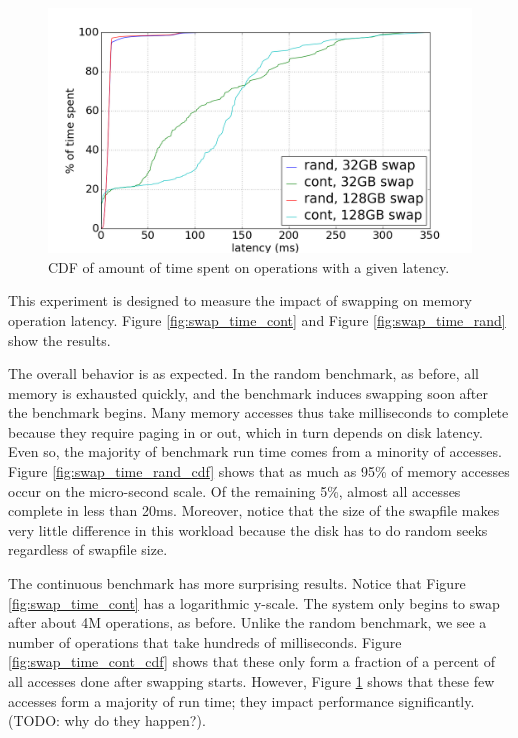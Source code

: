 \documentclass[twocolumn,11pt]{article}
\begin{document}
\begin{figure}
    \includegraphics[width=\columnwidth]{figures/swap_time_cdf}
    \caption{CDF of amount of time spent on operations with a given
    latency.\label{fig:swap_time_cdf}}
\end{figure}

This experiment is designed to measure the impact of swapping on memory
operation latency. Figure \ref{fig:swap_time_cont} and Figure
\ref{fig:swap_time_rand} show the results.

The overall behavior is as expected. In the random benchmark, as before, all
memory is exhausted quickly, and the benchmark induces swapping soon after the
benchmark begins. Many memory accesses thus take milliseconds to complete
because they require paging in or out, which in turn depends on disk latency.
Even so, the majority of benchmark run time comes from a minority of accesses.
Figure \ref{fig:swap_time_rand_cdf} shows that as much as 95\% of memory
accesses occur on the micro-second scale. Of the remaining 5\%, almost all
accesses complete in less than 20ms. Moreover, notice that the size of the
swapfile makes very little difference in this workload because the disk has to
do random seeks regardless of swapfile size.

The continuous benchmark has more surprising results. Notice that Figure
\ref{fig:swap_time_cont} has a logarithmic y-scale. The system only begins to
swap after about 4M operations, as before. Unlike the random benchmark, we see a
number of operations that take hundreds of milliseconds. Figure
\ref{fig:swap_time_cont_cdf} shows that these only form a fraction of a percent
of all accesses done after swapping starts. However, Figure
\ref{fig:swap_time_cdf} shows that these few accesses form a majority of run
time; they impact performance significantly. (TODO: why do they happen?).
\end{document}
